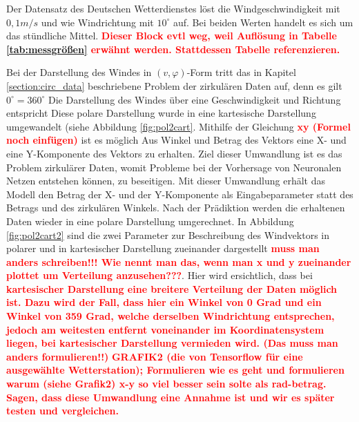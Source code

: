 \documentclass[
12pt, %
toc=listofnumbered, %
toc=chapterentrydotfill, %
numbers=noenddot, %
captions=tableheading, %
bibliography=numbered
]{scrreprt}
\newcommand{\highlight}[1]{\textbf{\textcolor{red}{#1}}}
\begin{document}
Der Datensatz des Deutschen Wetterdienstes löst die Windgeschwindigkeit mit $0,1 m/s$ und wie Windrichtung mit $10^\circ$ auf. Bei beiden Werten handelt es sich um das stündliche Mittel. \highlight{Dieser Block evtl weg, weil Auflösung in Tabelle \ref{tab:messgrößen} erwähnt werden. Stattdessen Tabelle referenzieren.}

Bei der Darstellung des Windes in $(v,\varphi)$-Form tritt das in Kapitel \ref{section:circ_data} beschriebene Problem der zirkulären Daten auf, denn es gilt $0^\circ = 360^\circ$ 
Die Darstellung des Windes über eine Geschwindigkeit und Richtung entspricht 
Diese polare Darstellung wurde in eine kartesische Darstellung umgewandelt (siehe Abbildung \ref{fig:pol2cart}. Mithilfe der Gleichung \highlight{xy (Formel noch einfügen)} ist es möglich Aus Winkel und Betrag des Vektors eine X- und eine Y-Komponente des Vektors zu erhalten. Ziel dieser Umwandlung ist es das Problem zirkulärer Daten, womit Probleme bei der Vorhersage von Neuronalen Netzen entstehen können, zu beseitigen. Mit dieser Umwandlung erhält das Modell den Betrag der X- und der Y-Komponente als Eingabeparameter statt des Betrags und des zirkulären Winkels. Nach der Prädiktion werden die erhaltenen Daten wieder in eine polare Darstellung umgerechnet. In Abbildung \ref{fig:pol2cart2} sind die zwei Parameter zur Beschreibung des Windvektors in polarer und in kartesischer Darstellung zueinander dargestellt \highlight{muss man anders schreiben!!! Wie nennt man das, wenn man x und y zueinander plottet um Verteilung anzusehen???}. Hier wird ersichtlich, dass bei \highlight{kartesischer Darstellung eine breitere Verteilung der Daten möglich ist. Dazu wird der Fall, dass hier ein Winkel von 0 Grad und ein Winkel von 359 Grad, welche derselben Windrichtung entsprechen, jedoch am weitesten entfernt voneinander im Koordinatensystem liegen, bei kartesischer Darstellung vermieden wird. (Das muss man anders formulieren!!)} 
\highlight{GRAFIK2 (die von Tensorflow für eine ausgewählte Wetterstation); 
Formulieren wie es geht und formulieren warum (siehe Grafik2) x-y so viel besser sein solte als rad-betrag. Sagen, dass diese Umwandlung eine Annahme ist und wir es später testen und vergleichen.}
\end{document}
